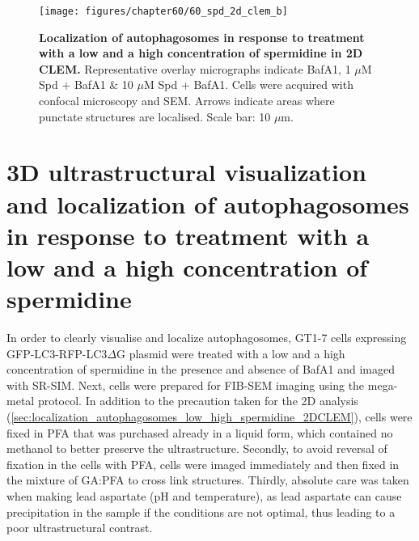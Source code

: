 \begin{landscape}
\begin{figure}[!htbp]
\centering
  \texttt{[image: figures/chapter60/60\_spd\_2d\_clem\_b]}
  \caption[Localization of autophagosomes in response to treatment with a low and a high concentration of spermidine in 2D CLEM]{\textbf{Localization of autophagosomes in response to treatment with a low and a high concentration of spermidine in 2D CLEM.} Representative overlay micrographs indicate BafA1, 1 $\mu$M Spd + BafA1 \& 10 $\mu$M Spd + BafA1. Cells were acquired with confocal microscopy and SEM. Arrows indicate areas where punctate structures are localised. Scale bar: 10 $\mu$m.}
  \label{fig:60_spd_2d_clem_b}
\end{figure} 
\end{landscape}

\section{3D ultrastructural visualization and localization of autophagosomes  in response to treatment with a low and a high concentration of spermidine}
In order to clearly visualise and localize autophagosomes, GT1-7 cells expressing GFP-LC3-RFP-LC3$\Delta$G plasmid were treated with a low and a high concentration of spermidine in the presence and absence of BafA1 and imaged with SR-SIM. Next, cells were prepared for FIB-SEM imaging using the mega-metal protocol. In addition to the precaution taken for the 2D analysis (\cref{sec:localization_autophagosomes_low_high_spermidine_2DCLEM}), cells were fixed in PFA that was purchased already in a liquid form, which contained no methanol to better preserve the ultrastructure. Secondly, to avoid reversal of fixation in the cells with PFA, cells were imaged immediately and then fixed in the mixture of GA:PFA to cross link structures. Thirdly, absolute care was taken when making lead aspartate (pH and temperature), as lead aspartate can cause precipitation in the sample if the conditions are not optimal, thus leading to a poor ultrastructural contrast.

